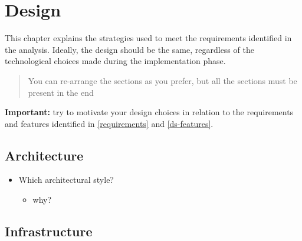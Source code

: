 \documentclass{scrartcl}
\begin{document}
\section{Design}\label{design}

This chapter explains the strategies used to meet the requirements identified in the analysis. 
%
Ideally, the design should be the same, regardless of the technological choices made during the implementation phase.

\begin{quote}
You can re-arrange the sections as you prefer, but all the sections must be present in the end
\end{quote}

\noindent
\textbf{Important:} try to motivate your design choices in relation to the requirements and features identified 
in \cref{requirements} and \cref{ds-features}.

\subsection{Architecture}\label{architecture}

\begin{itemize}
  \item Which architectural style?
  \begin{itemize}
    \item why?
  \end{itemize}
\end{itemize}

\subsection{Infrastructure}\label{infrastructure}
\end{document}
